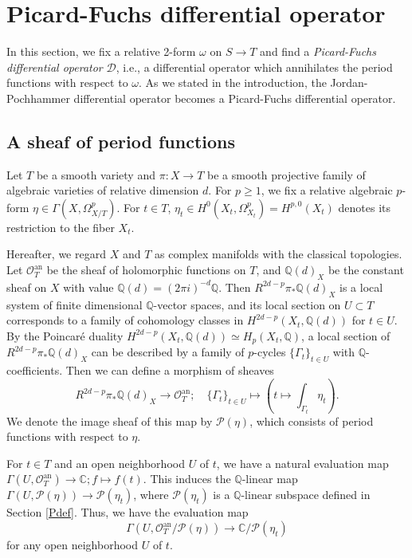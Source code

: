 \documentclass[letterpaper, 11pt]{amsart}
\theoremstyle{my theoremstyle}
\theoremstyle{dfn}
\theoremstyle{remark}
\renewcommand{\1}{\mathbbm{1}}
\newcommand{\C}{\mathbb{C}}
\newcommand{\Q}{\mathbb{Q}}
\numberwithin{equation}{section}
\begin{document}
\section{Picard-Fuchs differential operator}\label{PFop}
In this section, we fix a relative 2-form $\omega$ on $S\to T$ and find a \textit{Picard-Fuchs differential operator} $\mathscr{D}$, i.e., a differential operator which annihilates the period functions with respect to $\omega$.
As we stated in the introduction, the Jordan-Pochhammer differential operator becomes a Picard-Fuchs differential operator.

\subsection{A sheaf of period functions}
Let $T$ be a smooth variety and $\pi\colon X\to T$ be a smooth projective family of algebraic varieties of relative dimension $d$.
For $p\ge 1$, we fix a relative algebraic $p$-form $\eta\in \Gamma(X,\Omega_{X/T}^p)$. 
For $t\in T$, $\eta_t\in H^{0}(X_t,\Omega^{p}_{X_t})= H^{p,0}(X_t)$ denotes its restriction to the fiber $X_t$.

Hereafter, we regard $X$ and $T$ as complex manifolds with the classical topologies.
Let $\mathscr{O}_T^{\mathrm{an}}$ be the sheaf of holomorphic functions on $T$, and $\Q(d)_{X}$ be the constant sheaf on $X$ with value $\Q(d) = (2\pi i)^{-d}\Q$.
Then $R^{2d-p}\pi_*\Q(d)_X$ is a local system of finite dimensional $\Q$-vector spaces, and its local section on $U\subset T$ corresponds to a family of cohomology classes in $H^{2d-p}(X_t,\Q(d))$ for $t\in U$.
By the Poincar\'e duality $H^{2d-p}(X_t,\Q(d))\simeq H_p(X_t,\Q)$, a local section of $R^{2d-p}\pi_*\Q(d)_X$ can be described by a family of $p$-cycles $\{\Gamma_t\}_{t\in U}$ with $\Q$-coefficients.
Then we can define a morphism of sheaves
\begin{equation*}
R^{2d-p}\pi_*\Q(d)_X \to \mathscr{O}_T^{\mathrm{an}}; \quad\{\Gamma_t\}_{t\in U}\mapsto \left(t\mapsto \int_{\Gamma_t}\eta_t\right).
\end{equation*}
We denote the image sheaf of this map by $\mathcal{P}(\eta)$, which consists of period functions with respect to $\eta$.

For $t\in T$ and an open neighborhood $U$ of $t$, we have a natural evaluation map $\Gamma(U,\mathscr{O}_T^{\mathrm{an}})\rightarrow \C;f\mapsto f(t)$.
This induces the $\Q$-linear map $\Gamma(U,\mathcal{P}(\eta))\to \mathcal{P}(\eta_t)$,
where $\mathcal{P}(\eta_t)$ is a $\Q$-linear subspace defined in Section \ref{Pdef}.
Thus, we have the evaluation map
\begin{equation}\label{Qeval}
\Gamma(U,\mathscr{O}_{T}^{\mathrm{an}}/\mathcal{P}(\eta))\to \C/\mathcal{P}(\eta_t)
\end{equation}
for any open neighborhood $U$ of $t$.
\end{document}
